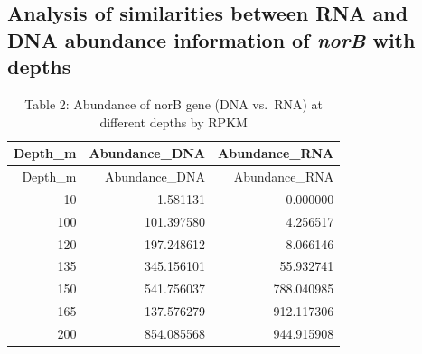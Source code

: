 \documentclass[11 pt,]{article}
\newenvironment{Shaded}{\begin{snugshade}}{\end{snugshade}}
\newcommand{\KeywordTok}[1]{\textcolor[rgb]{0.13,0.29,0.53}{\textbf{#1}}}
\newcommand{\DataTypeTok}[1]{\textcolor[rgb]{0.13,0.29,0.53}{#1}}
\newcommand{\StringTok}[1]{\textcolor[rgb]{0.31,0.60,0.02}{#1}}
\newcommand{\OperatorTok}[1]{\textcolor[rgb]{0.81,0.36,0.00}{\textbf{#1}}}
\newcommand{\NormalTok}[1]{#1}
\begin{document}
\subsection{\texorpdfstring{Analysis of similarities between RNA and DNA
abundance information of \emph{norB} with
depths}{Analysis of similarities between RNA and DNA abundance information of norB with depths}}\label{analysis-of-similarities-between-rna-and-dna-abundance-information-of-norb-with-depths}

\begin{Shaded}
\end{Shaded}

\begin{longtable}[]{@{}rrr@{}}
\caption{Table 2: Abundance of norB gene (DNA vs.~RNA) at different
depths by RPKM}\tabularnewline
\toprule
Depth\_m & Abundance\_DNA & Abundance\_RNA\tabularnewline
\midrule
\endfirsthead
\toprule
Depth\_m & Abundance\_DNA & Abundance\_RNA\tabularnewline
\midrule
\endhead
10 & 1.581131 & 0.000000\tabularnewline
100 & 101.397580 & 4.256517\tabularnewline
120 & 197.248612 & 8.066146\tabularnewline
135 & 345.156101 & 55.932741\tabularnewline
150 & 541.756037 & 788.040985\tabularnewline
165 & 137.576279 & 912.117306\tabularnewline
200 & 854.085568 & 944.915908\tabularnewline
\bottomrule
\end{longtable}
\end{document}
